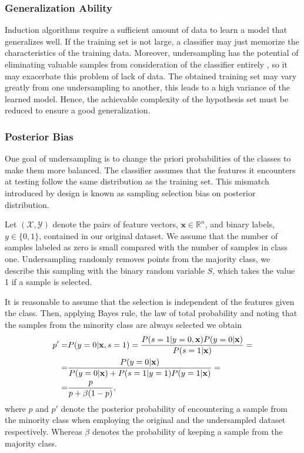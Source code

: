 \documentclass[conference]{IEEEtran}
\begin{document}
	\subsubsection{Generalization Ability}
		Induction algorithms require a sufficient amount of data to learn a model that generalizes well.  If the training set is not large, a classifier may just memorize the characteristics of the training data. Moreover, undersampling has the potential of eliminating valuable samples from consideration of the classifier entirely \cite{undersampling_generalization}, so it may exacerbate this problem of lack of data. The obtained training set may vary greatly from one undersampling to another, this leads to a high variance of the learned model. Hence, the achievable complexity of the hypothesis set must be reduced to ensure a good generalization.
		
	\subsubsection{Posterior Bias}
		One goal of undersampling is to change the priori probabilities of the classes to make them more balanced. The classifier assumes that the features it encounters at testing follow the same distribution as the training set. This mismatch introduced by design is known as sampling selection bias \cite{sampling_bias} on posterior distribution.

		Let $(\mathcal{X}, \mathcal{Y})$ denote the pairs of feature vectors, $\mathbf{x} \in \mathbb{R}^n$,  and binary labels, $y \in \{0, 1\}$, contained in our original dataset. We assume that the number of samples labeled as zero is small compared with the number of samples in class one. Undersampling randomly removes points from the majority class, we describe this sampling with the binary random variable $S$, which takes the value 1 if a sample is selected.

		It is reasonable to assume that the selection is independent of the features given the class. Then, applying Bayes rule, the law of total probability and noting that the samples from the minority class are always selected we obtain
		\begin{align*} \label{posterior}
			p' = & P(y=0|\mathbf{x}, s=1)=  \frac{P(s=1|y=0, \mathbf{x})P(y=0|\mathbf{x})}{P(s=1|\mathbf{x})}=\notag\\
					=&  \frac{P(y=0|\mathbf{x})}{P(y=0|\mathbf{x})+P(s=1|y=1)P(y=1|\mathbf{x})}=\notag\\
=&\frac{p}{p+\beta(1-p)},
		\end{align*}
where $p$ and $p'$ denote the posterior probability of encountering a sample from the minority class when employing the original and the undersampled dataset respectively. Whereas $\beta$ denotes the probability of keeping a sample from the majority class.
\end{document}
